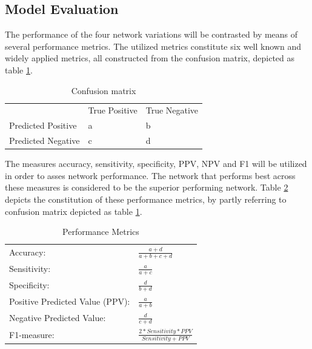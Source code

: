 \documentclass[12pt]{article}
\begin{document}
\egroup


\clearpage
\subsection{Model Evaluation}
The performance of the four network variations will be contrasted by means of several performance metrics. The utilized metrics constitute six well known and widely applied metrics, all constructed from the confusion matrix, depicted as table \ref{table:confusion}.

\bigskip
\bgroup
\def\arraystretch{1.6}%
\begin{table}[h]
\centering
\caption{Confusion matrix}
\label{table:confusion}
\begin{tabular}{lll}
                                        & True Positive          & True Negative          \\ \cline{2-3} 
\multicolumn{1}{l|}{Predicted Positive} & \multicolumn{1}{l|}{a} & \multicolumn{1}{l|}{b} \\ \cline{2-3} 
\multicolumn{1}{l|}{Predicted Negative} & \multicolumn{1}{l|}{c} & \multicolumn{1}{l|}{d} \\ \cline{2-3} 
\end{tabular}
\end{table}
\egroup

The measures accuracy, sensitivity, specificity, PPV, NPV and F1 will be utilized in order to asses network performance. The network that performs best across these measures is considered to be the superior performing network. Table \ref{table:metrics} depicts the constitution of these performance metrics, by partly referring to confusion matrix depicted as table \ref{table:confusion}. 
\bigskip
\bgroup
\def\arraystretch{1.8}%
\begin{table}[h]
\centering
\caption{Performance Metrics}
\label{table:metrics}
\begin{tabular}{ll}
\hline
Accuracy:                       & \(\frac{\!\!\!\!\!\!\!\!\!\!\!\!\!\!a+d}{a+b+c+d}\) \\
Sensitivity:                    & \(\frac{a}{a+c}\)                                   \\
Specificity:                    & \(\frac{d}{b+d}\)                                   \\
Positive Predicted Value (PPV): & \(\frac{a}{a+b}\)                                   \\
Negative Predicted Value:       & \(\frac{d}{c+d}\)                                   \\
F1-measure:                     & \(\frac{2*Sensitivity*PPV}{Sensitivity+PPV}\)       \\ \hline
\end{tabular}
\end{table}
\egroup

\newpage



\end{document}
